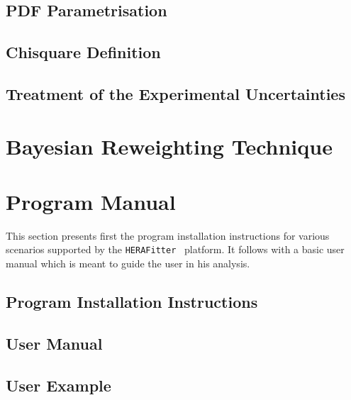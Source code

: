 \documentclass[11pt,twoside,a4paper]{article}
\newcommand\fitter{ \mbox{\tt HERAFitter} }
\begin{document}
\subsection{PDF Parametrisation}


\subsection{Chisquare  Definition}


\subsection{Treatment of the Experimental Uncertainties}
\label{sec:error}


\section{Bayesian Reweighting Technique}
\label{sec:reweighting}
 



\newpage
\section{Program Manual}
\label{sec:progman}
This section presents first the program installation instructions for various scenarios supported by the \fitter\ platform. It follows with a basic user manual which is meant to guide the user in his analysis. 
\subsection{Program Installation Instructions} 

\subsection{User Manual}

\subsection{User Example}



\appendix
%
\end{document}
